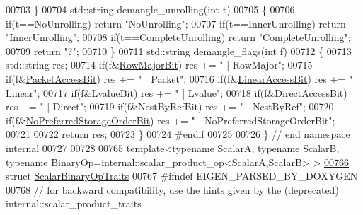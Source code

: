 \begin{DoxyCode}
{00703 \}
00704 std::string demangle\_unrolling(\textcolor{keywordtype}{int} t)
00705 \{
00706   \textcolor{keywordflow}{if}(t==NoUnrolling) \textcolor{keywordflow}{return} \textcolor{stringliteral}{"NoUnrolling"};
00707   \textcolor{keywordflow}{if}(t==InnerUnrolling) \textcolor{keywordflow}{return} \textcolor{stringliteral}{"InnerUnrolling"};
00708   \textcolor{keywordflow}{if}(t==CompleteUnrolling) \textcolor{keywordflow}{return} \textcolor{stringliteral}{"CompleteUnrolling"};
00709   \textcolor{keywordflow}{return} \textcolor{stringliteral}{"?"};
00710 \}
00711 std::string demangle\_flags(\textcolor{keywordtype}{int} f)
00712 \{
00713   std::string res;
00714   \textcolor{keywordflow}{if}(f&\hyperlink{group__flags_gae4f56c2a60bbe4bd2e44c5b19cbe8762}{RowMajorBit})                 res += \textcolor{stringliteral}{" | RowMajor"};
00715   \textcolor{keywordflow}{if}(f&\hyperlink{group__flags_ga1a306a438e1ab074e8be59512e887b9f}{PacketAccessBit})             res += \textcolor{stringliteral}{" | Packet"};
00716   \textcolor{keywordflow}{if}(f&\hyperlink{group__flags_ga4b983a15d57cd55806df618ac544d09e}{LinearAccessBit})             res += \textcolor{stringliteral}{" | Linear"};
00717   \textcolor{keywordflow}{if}(f&\hyperlink{group__flags_gae2c323957f20dfdc6cb8f44428eaec1a}{LvalueBit})                   res += \textcolor{stringliteral}{" | Lvalue"};
00718   \textcolor{keywordflow}{if}(f&\hyperlink{group__flags_gabf1e9d0516a933445a4c307ad8f14915}{DirectAccessBit})             res += \textcolor{stringliteral}{" | Direct"};
00719   \textcolor{keywordflow}{if}(f&NestByRefBit)                res += \textcolor{stringliteral}{" | NestByRef"};
00720   \textcolor{keywordflow}{if}(f&\hyperlink{group__flags_ga3c186ad80ddcf5e2ed3d7ee31cca1860}{NoPreferredStorageOrderBit})  res += \textcolor{stringliteral}{" | NoPreferredStorageOrderBit"};
00721   
00722   \textcolor{keywordflow}{return} res;
00723 \}
00724 \textcolor{preprocessor}{#endif}
00725 
00726 \} \textcolor{comment}{// end namespace internal}
00727 
00728 
00765 \textcolor{keyword}{template}<\textcolor{keyword}{typename} ScalarA, \textcolor{keyword}{typename} ScalarB, \textcolor{keyword}{typename} BinaryOp=\textcolor{keywordtype}{int}ernal::scalar\_product\_op<ScalarA,ScalarB>
       >
\hyperlink{group___core___module}{00766} \textcolor{keyword}{struct }\hyperlink{group___core___module_struct_eigen_1_1_scalar_binary_op_traits}{ScalarBinaryOpTraits}
00767 #ifndef EIGEN\_PARSED\_BY\_DOXYGEN
00768   \textcolor{comment}{// for backward compatibility, use the hints given by the (deprecated) internal::scalar\_product\_traits
}}
\end{DoxyCode}
